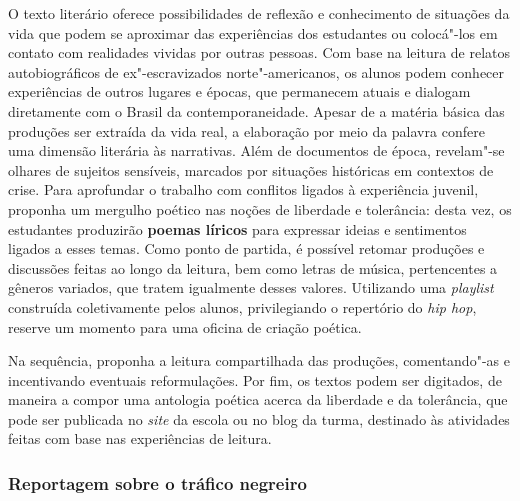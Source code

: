 \documentclass[12pt]{extarticle}
\begin{document}
O texto literário oferece possibilidades de reflexão e conhecimento de
situações da vida que podem se aproximar das experiências dos
estudantes ou colocá"-los em contato com realidades vividas por outras
pessoas. Com base na leitura de relatos autobiográficos de
ex"-escravizados norte"-americanos, os alunos podem conhecer
experiências de outros lugares e épocas, que permanecem atuais e
dialogam diretamente com o Brasil da contemporaneidade. Apesar de a
matéria básica das produções ser extraída da vida real, a elaboração
por meio da palavra confere uma dimensão literária às narrativas. Além
de documentos de época, revelam"-se olhares de sujeitos sensíveis,
marcados por situações históricas em contextos de crise. Para
aprofundar o trabalho com conflitos ligados à experiência juvenil,
proponha um mergulho poético nas noções de liberdade e tolerância:
desta vez, os estudantes produzirão \textbf{poemas líricos} para
expressar ideias e sentimentos ligados a esses temas. Como ponto de
partida, é possível retomar produções e discussões feitas ao longo da
leitura, bem como letras de música, pertencentes a gêneros variados,
que tratem igualmente desses valores. Utilizando uma \emph{playlist}
construída coletivamente pelos alunos, privilegiando o repertório do
\emph{hip hop}, reserve um momento para uma oficina de criação
poética. 


Na sequência, proponha a leitura compartilhada das produções,
comentando"-as e incentivando eventuais reformulações. Por fim, os
textos podem ser digitados, de maneira a compor uma antologia poética
acerca da liberdade e da tolerância, que pode ser publicada no
\emph{site} da escola ou no blog da turma, destinado às atividades
feitas com base nas experiências de leitura.

\subsubsection{Reportagem sobre o tráfico negreiro}
\end{document}
